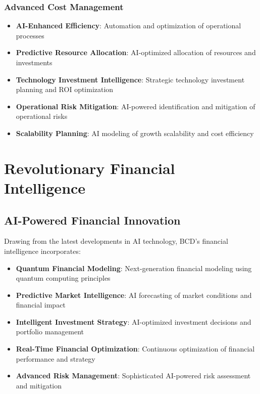 \documentclass[12pt,a4paper]{book}
\begin{document}
\subsubsection{Advanced Cost Management}

\begin{itemize}
    \item \textbf{AI-Enhanced Efficiency}: Automation and optimization of operational processes
    \item \textbf{Predictive Resource Allocation}: AI-optimized allocation of resources and investments
    \item \textbf{Technology Investment Intelligence}: Strategic technology investment planning and ROI optimization
    \item \textbf{Operational Risk Mitigation}: AI-powered identification and mitigation of operational risks
    \item \textbf{Scalability Planning}: AI modeling of growth scalability and cost efficiency
\end{itemize}

\section{Revolutionary Financial Intelligence}

\subsection{AI-Powered Financial Innovation}

Drawing from the latest developments in AI technology, BCD's financial intelligence incorporates:

\begin{itemize}
    \item \textbf{Quantum Financial Modeling}: Next-generation financial modeling using quantum computing principles
    \item \textbf{Predictive Market Intelligence}: AI forecasting of market conditions and financial impact
    \item \textbf{Intelligent Investment Strategy}: AI-optimized investment decisions and portfolio management
    \item \textbf{Real-Time Financial Optimization}: Continuous optimization of financial performance and strategy
    \item \textbf{Advanced Risk Management}: Sophisticated AI-powered risk assessment and mitigation
\end{itemize}
\end{document}
